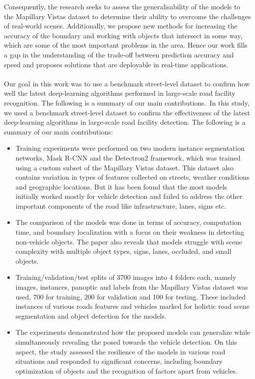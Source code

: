 \documentclass[conference]{IEEEtran}
\begin{document}
Consequently, the research seeks to assess the generalisability of the models to the Mapillary Vistas dataset to determine their ability to overcome the challenges of real-world scenes. Additionally, we propose new methods for increasing the accuracy of the boundary and working with objects that intersect in some way, which are some of the most important problems in the area. Hence our work fills a gap in the understanding of the trade-off between prediction accuracy and speed and proposes solutions that are deployable in real-time applications.
\\
\\
Our goal in this work was to use a benchmark street-level dataset to confirm how well the latest deep-learning algorithms performed in large-scale road facility recognition. The following is a summary of our main contributions. In this study, we used a benchmark street-level dataset to confirm the effectiveness of the latest deep-learning algorithms in large-scale road facility detection. The following is a summary of our main contributions:
\begin{itemize}
    \item Training experiments were performed on two modern instance segmentation networks, Mask R-CNN and the Detectron2 framework, which was trained using a custom subset of the Mapillary Vistas dataset. This dataset also contains variation in types of features collected on streets, weather conditions and geographic locations. But it has been found that the most models initially worked mostly for vehicle detection and failed to address the other important components of the road like infrastructure, lanes, signs etc.
    \item The comparison of the models was done in terms of accuracy, computation time, and boundary localization with a focus on their weakness in detecting non-vehicle objects. The paper also reveals that models struggle with scene complexity with multiple object types, signs, lanes, occluded, and small objects.
    \item Training/validation/test splits of 3700 images into 4 folders each, namely images, instances, panoptic and labels from the Mapillary Vistas dataset was used, 700 for training, 200 for validation and 100 for testing\cite{3}. These included instances of various roads features and vehicles marked for holistic road scene segmentation and object detection for the models.
    \item The experiments demonstrated how the proposed models can generalize while simultaneously revealing the posed towards the vehicle detection. On this aspect, the study assessed the resilience of the models in various road situations and responded to significant concerns, including boundary optimization of objects and the recognition of factors apart from vehicles.
\end{itemize}
\end{document}
